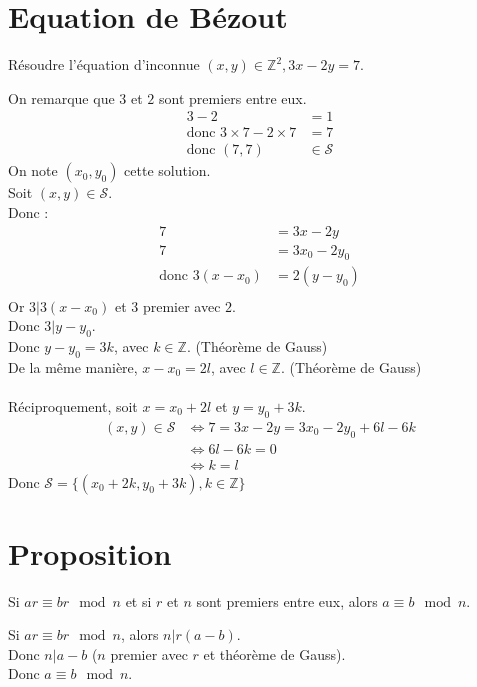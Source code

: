 \documentclass[../main.tex]{subfiles}
\begin{document}
\section{Equation de Bézout}
\begin{tcolorbox}[title=Exemple 12.31, title filled=false, colframe=darkgreen, colback=darkgreen!10!white]
    Résoudre l'équation d'inconnue $(x, y) \in \mathbb{Z}^2, 3x - 2y = 7$. 
\end{tcolorbox}
On remarque que $3$ et $2$ sont premiers entre eux. \\
\begin{align*}
    3 - 2 &= 1 \\
    \text{donc } 3 \times 7 - 2 \times 7 &= 7 \\
    \text{donc } (7, 7) &\in \mathcal{S}
\end{align*}
On note $(x_0, y_0)$ cette solution. \\
Soit $(x, y) \in \mathcal{S}$. \\
Donc : 
\begin{align*}
    7 &= 3x - 2y \\
    7 &= 3x_0 - 2y_0 \\
    \text{donc } 3(x - x_0) &= 2(y - y_0) \\
\end{align*}
Or $3|3(x - x_0)$ et $3$ premier avec $2$. \\
Donc $3|y - y_0$. \\
Donc $y - y_0 = 3k$, avec $k \in \mathbb{Z}$. (Théorème de Gauss) \\
De la même manière, $x - x_0 = 2l$, avec $l \in \mathbb{Z}$. (Théorème de Gauss) \\ \\

\noindent Réciproquement, soit $x = x_0 + 2l$ et $y = y_0 + 3k$. \\
\begin{align*}
    (x, y) \in \mathcal{S} &\Leftrightarrow 7 = 3x - 2y = 3x_0 - 2y_0 + 6l - 6k \\
    &\Leftrightarrow 6l - 6k = 0 \\
    &\Leftrightarrow k = l
\end{align*}
Donc $\mathcal{S} = \{(x_0 + 2k, y_0 + 3k), k \in \mathbb{Z}\}$

\section{Proposition}
\begin{tcolorbox}[title=Propostion 12.32, title filled=false, colframe=lightblue, colback=lightblue!10!white]
    Si $ar \equiv br \mod n$ et si $r$ et $n$ sont premiers entre eux, alors $a \equiv b \mod n$.
\end{tcolorbox}
Si $ar \equiv br \mod n$, alors $n|r(a-b)$. \\
Donc $n|a-b$ ($n$ premier avec $r$ et théorème de Gauss). \\
Donc $a \equiv b \mod n$.
\end{document}
